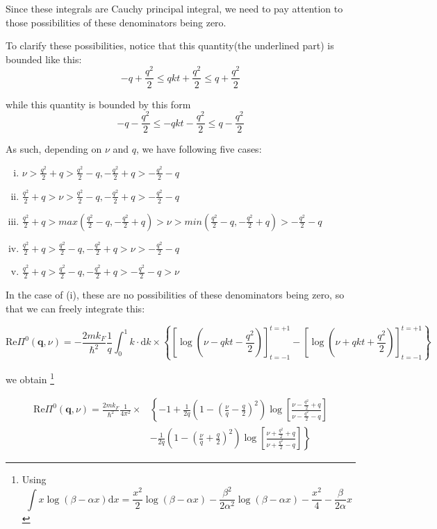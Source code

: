 Since these integrals are Cauchy principal integral, we need to pay attention to those possibilities of these denominators being zero.

To clarify these possibilities, notice that this quantity(the underlined part) is bounded like this:
\[ -q+\frac{q^2}{2} \leq qkt + \frac{q^2}{2} \leq q + \frac{q^2}{2}  \]

while this quantity is bounded by this form
\[ -q-\frac{q^2}{2} \leq -qkt - \frac{q^2}{2} \leq q - \frac{q^2}{2}\]

As such, depending on $\nu$ and $q$, we have following five cases:
\begin{enumerate}[(i)]
\item $\nu > \frac{q^2}{2}+q > \frac{q^2}{2}-q, -\frac{q^2}{2}+q > -\frac{q^2}{2}-q$
\item $\frac{q^2}{2}+q>\nu > \frac{q^2}{2}-q, -\frac{q^2}{2}+q > -\frac{q^2}{2}-q$
\item $\frac{q^2}{2}+q > max(\frac{q^2}{2}-q,-\frac{q^2}{2}+q) > \nu > min(\frac{q^2}{2}-q,-\frac{q^2}{2}+q) > -\frac{q^2}{2}-q$
\item $\frac{q^2}{2} + q > \frac{q^2}{2}-q, -\frac{q^2}{2}+q>\nu>-\frac{q^2}{2}-q$
\item $\frac{q^2}{2}+q > \frac{q^2}{2}-q, -\frac{q^2}{2}+q > -\frac{q^2}{2}-q > \nu$
\end{enumerate}

In the case of (i), these are no possibilities of these denominators being zero, so that we can freely integrate this:

\[\text{Re} \Pi^0(\mathbf{q},\nu)
= -\frac{2 m k_F}{\hbar^2} \frac{1}{q} \int_0^1 k \cdot \mathrm{d} k \times \left\{ 
\left[ \log(\nu-q k t-\frac{q^2}{2}) \right]_{t=-1}^{t=+1} - \left[ \log(\nu+q k t+\frac{q^2}{2}) \right]_{t=-1}^{t=+1}
 \right\}\]

we obtain
\footnote{Using
\[ \int x \log(\beta-\alpha x) \mathrm{d}x = \frac{x^2}{2} \log(\beta - \alpha x) - \frac{\beta^2}{2 \alpha^2} \log(\beta - \alpha x) - \frac{x^2}{4}- \frac{\beta}{2\alpha}x \]}

\[ \begin{split}\text{Re} \Pi^0(\mathbf{q},\nu)
= \frac{2 m k_F}{\hbar^2} \frac{1}{4\pi^2} \times&\left\{ -1 + \frac{1}{2q}\left( 1-(\frac{\nu}{q}-\frac{q}{2})^2 \right) \log\left[ \frac{\nu-\frac{q^2}{2}+q}{\nu-\frac{q^2}{2}-q} \right] \right. \\
&\left. -\frac{1}{2q}\left( 1-(\frac{\nu}{q}+\frac{q}{2})^2 \right) \log\left[ \frac{\nu+\frac{q^2}{2}+q}{\nu+\frac{q^2}{2}-q} \right] \right\}
\end{split}\]

